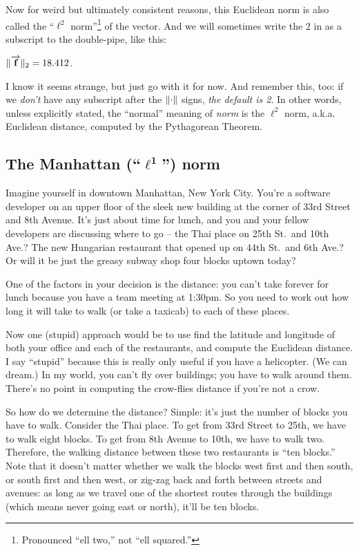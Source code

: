 Now for weird but ultimately consistent reasons, this Euclidean norm is also
called the ``$\ell^2$ norm''\footnote{Pronounced ``ell two,'' not ``ell
squared.''} of the vector. And we will sometimes write the 2 in as a subscript
to the double-pipe, like this:

\begin{center}
$\lVert\overrightarrow{\textbf{f}}\rVert_2 = 18.412$.
\end{center}

I know it seems strange, but just go with it for now. And remember this, too:
if we \textit{don't} have any subscript after the $\lVert\cdot\rVert$ signs,
\textit{the default is 2}. In other words, unless explicitly stated, the
``normal'' meaning of \textit{norm} is the $\ell^2$ norm, a.k.a. Euclidean
distance, computed by the Pythagorean Theorem.

\subsection{The Manhattan (``$\boldsymbol\ell^\textbf{1}$'') norm}



Imagine yourself in downtown Manhattan, New York City. You're a software
developer on an upper floor of the sleek new building at the corner of 33rd
Street and 8th Avenue. It's just about time for lunch, and you and your fellow
developers are discussing where to go -- the Thai place on 25th St.~and 10th
Ave.? The new Hungarian restaurant that opened up on 44th St.~and 6th Ave.? Or
will it be just the greasy subway shop four blocks uptown today?

One of the factors in your decision is the distance: you can't take forever for
lunch because you have a team meeting at 1:30pm. So you need to work out how
long it will take to walk (or take a taxicab) to each of these places. 

Now one (stupid) approach would be to use find the latitude and longitude of
both your office and each of the restaurants, and compute the Euclidean
distance. I say ``stupid'' because this is really only useful if you have a
helicopter. (We can dream.) In my world, you can't fly over buildings; you have
to walk around them. There's no point in computing the crow-flies distance if
you're not a crow.

So how do we determine the distance? Simple: it's just the number of blocks you
have to walk. Consider the Thai place. To get from 33rd Street to 25th, we have
to walk eight blocks. To get from 8th Avenue to 10th, we have to walk two.
Therefore, the walking distance between these two restaurants is ``ten
blocks.'' Note that it doesn't matter whether we walk the blocks west first and
then south, or south first and then west, or zig-zag back and forth between
streets and avenues: as long as we travel one of the shortest routes through
the buildings (which means never going east or north), it'll be ten blocks.

